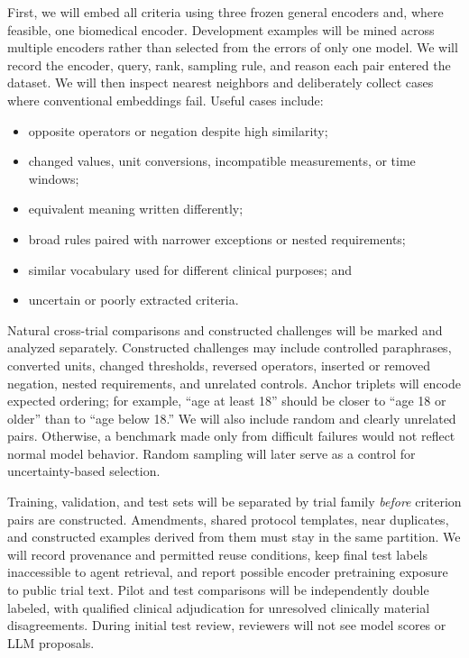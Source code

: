 \documentclass[11pt]{article}
\begin{document}
First, we will embed all criteria using three frozen general encoders and, where feasible, one biomedical encoder. Development examples will be mined across multiple encoders rather than selected from the errors of only one model. We will record the encoder, query, rank, sampling rule, and reason each pair entered the dataset. We will then inspect nearest neighbors and deliberately collect cases where conventional embeddings fail. Useful cases include:

\begin{itemize}
    \item opposite operators or negation despite high similarity;
    \item changed values, unit conversions, incompatible measurements, or time windows;
    \item equivalent meaning written differently;
    \item broad rules paired with narrower exceptions or nested requirements;
    \item similar vocabulary used for different clinical purposes; and
    \item uncertain or poorly extracted criteria.
\end{itemize}

Natural cross-trial comparisons and constructed challenges will be marked and analyzed separately. Constructed challenges may include controlled paraphrases, converted units, changed thresholds, reversed operators, inserted or removed negation, nested requirements, and unrelated controls. Anchor triplets will encode expected ordering; for example, ``age at least 18'' should be closer to ``age 18 or older'' than to ``age below 18.'' We will also include random and clearly unrelated pairs. Otherwise, a benchmark made only from difficult failures would not reflect normal model behavior. Random sampling will later serve as a control for uncertainty-based selection.

Training, validation, and test sets will be separated by trial family \emph{before} criterion pairs are constructed. Amendments, shared protocol templates, near duplicates, and constructed examples derived from them must stay in the same partition. We will record provenance and permitted reuse conditions, keep final test labels inaccessible to agent retrieval, and report possible encoder pretraining exposure to public trial text. Pilot and test comparisons will be independently double labeled, with qualified clinical adjudication for unresolved clinically material disagreements. During initial test review, reviewers will not see model scores or LLM proposals.
\end{document}
